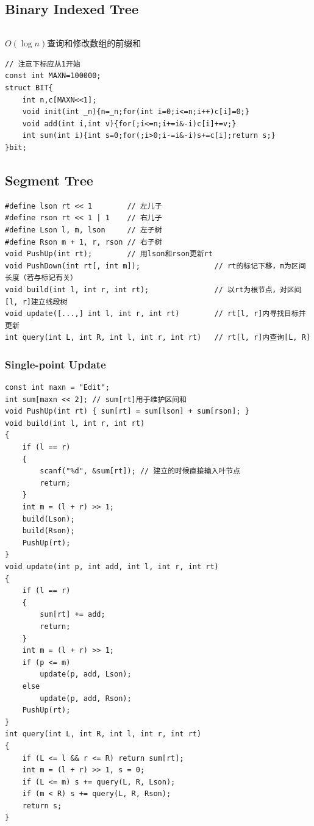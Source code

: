 \documentclass[twoside]{article}
\begin{document}
\subsection{Binary Indexed Tree}
\begin{lstlisting}
\end{lstlisting}
$O(\log n)$查询和修改数组的前缀和
\begin{lstlisting}
// 注意下标应从1开始
const int MAXN=100000;
struct BIT{
    int n,c[MAXN<<1];
    void init(int _n){n=_n;for(int i=0;i<=n;i++)c[i]=0;}
    void add(int i,int v){for(;i<=n;i+=i&-i)c[i]+=v;}
    int sum(int i){int s=0;for(;i>0;i-=i&-i)s+=c[i];return s;}
}bit;
\end{lstlisting}
\subsection{Segment Tree}
\begin{lstlisting}
#define lson rt << 1        // 左儿子
#define rson rt << 1 | 1    // 右儿子
#define Lson l, m, lson     // 左子树
#define Rson m + 1, r, rson // 右子树
void PushUp(int rt);        // 用lson和rson更新rt
void PushDown(int rt[, int m]);                 // rt的标记下移，m为区间长度（若与标记有关）
void build(int l, int r, int rt);               // 以rt为根节点，对区间[l, r]建立线段树
void update([...,] int l, int r, int rt)        // rt[l, r]内寻找目标并更新
int query(int L, int R, int l, int r, int rt)   // rt[l, r]内查询[L, R]
\end{lstlisting}
\subsubsection{Single-point Update}
\begin{lstlisting}
const int maxn = "Edit";
int sum[maxn << 2]; // sum[rt]用于维护区间和
void PushUp(int rt) { sum[rt] = sum[lson] + sum[rson]; }
void build(int l, int r, int rt)
{
    if (l == r)
    {
        scanf("%d", &sum[rt]); // 建立的时候直接输入叶节点
        return;
    }
    int m = (l + r) >> 1;
    build(Lson);
    build(Rson);
    PushUp(rt);
}
void update(int p, int add, int l, int r, int rt)
{
    if (l == r)
    {
        sum[rt] += add;
        return;
    }
    int m = (l + r) >> 1;
    if (p <= m)
        update(p, add, Lson);
    else
        update(p, add, Rson);
    PushUp(rt);
}
int query(int L, int R, int l, int r, int rt)
{
    if (L <= l && r <= R) return sum[rt];
    int m = (l + r) >> 1, s = 0;
    if (L <= m) s += query(L, R, Lson);
    if (m < R) s += query(L, R, Rson);
    return s;
}
\end{lstlisting}
\end{document}
